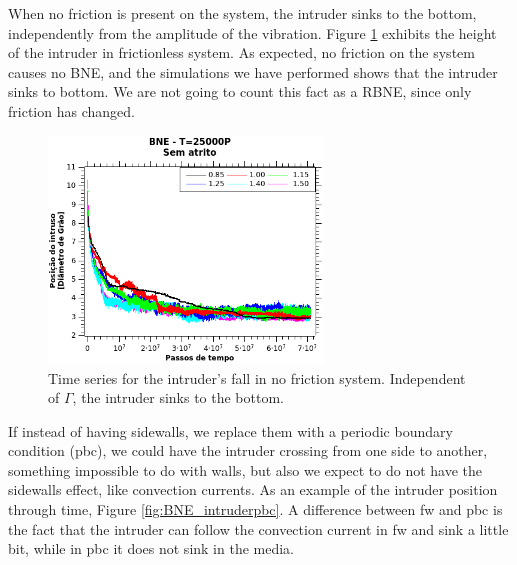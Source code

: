     When no friction is present on the system, the intruder sinks to the bottom, independently from the amplitude of the vibration. Figure \ref{fig:BNE25000_sem_Atrito} exhibits the height of the intruder in frictionless system. As expected, no friction on the system causes no BNE, and the simulations we have performed shows that the intruder sinks to bottom. We are not going to count this fact as a RBNE, since only friction has changed.

\begin{figure}
    \centering
    \includegraphics[width=0.65\textwidth]{04-figuras/BNE25000semAtrito.png}
    \caption[Frictionless grains and walls.]{Time series for the intruder's fall in no friction system. Independent of $\Gamma$, the intruder sinks to the bottom.}
    \label{fig:BNE25000_sem_Atrito}
\end{figure}

    If instead of having sidewalls, we replace them with a periodic boundary condition (pbc), we could have the intruder crossing from one side to another, something impossible to do with walls, but also we expect to do not have the sidewalls effect, like convection currents. As an example of the intruder position through time, Figure \ref{fig:BNE_intruderpbc}. A difference between fw and pbc is the fact that the intruder can follow the convection current in fw and sink a little bit, while in pbc it does not sink in the media.

